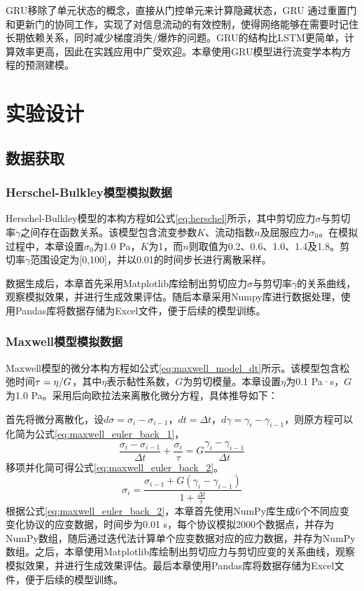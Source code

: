 GRU移除了单元状态的概念，直接从门控单元来计算隐藏状态，GRU 通过重置门和更新门的协同工作，实现了对信息流动的有效控制，使得网络能够在需要时记住长期依赖关系，同时减少梯度消失/爆炸的问题。GRU的结构比LSTM更简单，计算效率更高，因此在实践应用中广受欢迎。本章使用GRU模型进行流变学本构方程的预测建模。

\section{实验设计}
\subsection{数据获取}
\subsubsection{Herschel-Bulkley模型模拟数据}
Herschel-Bulkley模型的本构方程如公式\eqref{eq:herschel}所示，其中剪切应力$\sigma$与剪切率$\dot{\gamma}$之间存在函数关系。该模型包含流变参数$K$、流动指数$n$及屈服应力$\sigma_0$。在模拟过程中，本章设置$\sigma_0$为1.0 Pa，$K$为1，而$n$则取值为0.2、0.6、1.0、1.4及1.8。剪切率$\dot{\gamma}$范围设定为[0,100]，并以0.01的时间步长进行离散采样。

数据生成后，本章首先采用Matplotlib库绘制出剪切应力$\sigma$与剪切率$\dot{\gamma}$的关系曲线，观察模拟效果，并进行生成效果评估。随后本章采用Numpy库进行数据处理，使用Pandas库将数据存储为Excel文件，便于后续的模型训练。
\subsubsection{Maxwell模型模拟数据}
Maxwell模型的微分本构方程如公式\eqref{eq:maxwell_model_dt}所示。该模型包含松弛时间$\tau=\eta/\\G$，其中$\eta$表示黏性系数，$G$为剪切模量。本章设置$\eta$为0.1 Pa·s，$G$为1.0 Pa。采用后向欧拉法来离散化微分方程，具体推导如下：

首先将微分离散化，设$d\sigma=\sigma_i - \sigma_{i-1}$，$dt=\Delta t$，$d\gamma=\gamma_i - \gamma_{i-1}$，则原方程可以化简为公式\eqref{eq:maxwell_euler_back_1}，
\begin{equation}
  \frac{\sigma_i - \sigma_{i-1}}{\Delta t} + \frac{\sigma_i}{\tau} = G \frac{\gamma_i - \gamma_{i-1}}{\Delta t} \label{eq:maxwell_euler_back_1}
\end{equation}
移项并化简可得公式\eqref{eq:maxwell_euler_back_2}。
\begin{equation}
  \sigma_i = \frac{\sigma_{i-1} + G (\gamma_i - \gamma_{i-1})}{1 + \frac{\Delta t}{\tau}} \label{eq:maxwell_euler_back_2}
\end{equation}
根据公式\eqref{eq:maxwell_euler_back_2}，本章首先使用NumPy库生成6个不同应变变化协议的应变数据，时间步为0.01 s，每个协议模拟2000个数据点，并存为NumPy数组，随后通过迭代法计算单个应变数据对应的应力数据，并存为NumPy数组。之后，本章使用Matplotlib库绘制出剪切应力与剪切应变的关系曲线，观察模拟效果，并进行生成效果评估。最后本章使用Pandas库将数据存储为Excel文件，便于后续的模型训练。
